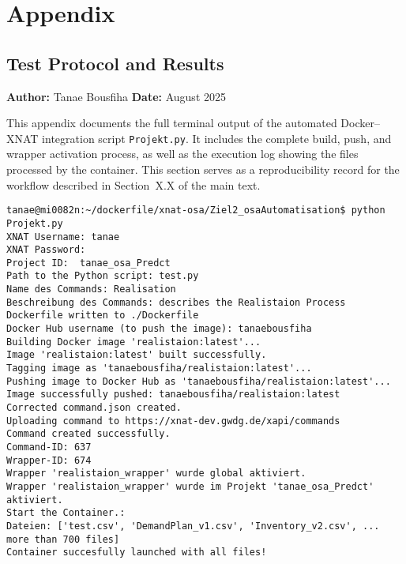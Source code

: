 
    


\appendix
\chapter{Appendix}
\section{Test Protocol and Results}

\label{app:test}

\noindent\textbf{Author:} Tanae Bousfiha  
\noindent\textbf{Date:} August 2025  

\noindent This appendix documents the full terminal output of the automated Docker–XNAT integration script
\texttt{Projekt.py}.  
It includes the complete build, push, and wrapper activation process, as well as the execution log showing the files processed by the container.  
This section serves as a reproducibility record for the workflow described in Section~X.X of the main text.

\begin{lstlisting}
tanae@mi0082n:~/dockerfile/xnat-osa/Ziel2_osaAutomatisation$ python Projekt.py
XNAT Username: tanae
XNAT Password:
Project ID:  tanae_osa_Predct
Path to the Python script: test.py
Name des Commands: Realisation
Beschreibung des Commands: describes the Realistaion Process
Dockerfile written to ./Dockerfile
Docker Hub username (to push the image): tanaebousfiha
Building Docker image 'realistaion:latest'...
Image 'realistaion:latest' built successfully.
Tagging image as 'tanaebousfiha/realistaion:latest'...
Pushing image to Docker Hub as 'tanaebousfiha/realistaion:latest'...
Image successfully pushed: tanaebousfiha/realistaion:latest
Corrected command.json created.
Uploading command to https://xnat-dev.gwdg.de/xapi/commands
Command created successfully.
Command-ID: 637
Wrapper-ID: 674
Wrapper 'realistaion_wrapper' wurde global aktiviert.
Wrapper 'realistaion_wrapper' wurde im Projekt 'tanae_osa_Predct' aktiviert.
Start the Container.:
Dateien: ['test.csv', 'DemandPlan_v1.csv', 'Inventory_v2.csv', ... more than 700 files]
Container succesfully launched with all files!
\end{lstlisting}

